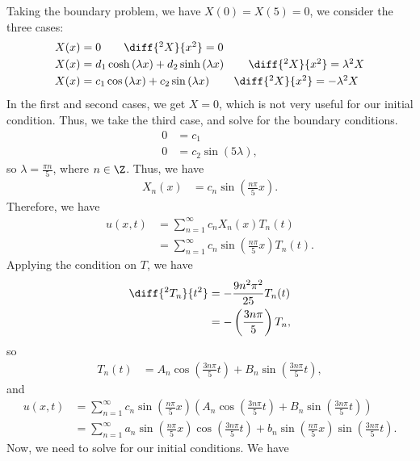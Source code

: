 \documentclass[10pt]{mypackage}
\begin{document}
\begin{example}
  Taking the boundary problem, we have $X(0) = X(5) = 0$, we consider the three cases:
  \begin{align*}
    X(x) &= 0 \tag*{$\diff{^2X}{x^2} = 0$}\\
    X(x) &= d_1\cosh\left( \lambda x \right) + d_2\sinh\left( \lambda x \right) \tag*{$\diff{^2X}{x^2} = \lambda^2 X$}\\
    X(x) &= c_1\cos\left( \lambda x \right) + c_2\sin\left( \lambda x \right) \tag*{$\diff{^2X}{x^2} = -\lambda^2 X$}
  \end{align*}
  In the first and second cases, we get $X = 0$, which is not very useful for our initial condition. Thus, we take the third case, and solve for the boundary conditions.
  \begin{align*}
    0 &= c_1\\
    0 &= c_2\sin\left( 5\lambda \right),
  \end{align*}
  so $\lambda = \frac{\pi n}{5}$, where $n\in\Z$. Thus, we have
  \begin{align*}
    X_n(x) &= c_n\sin\left( \frac{n\pi }{5}x \right).
  \end{align*}
  Therefore, we have
  \begin{align*}
    u\left( x,t \right) &= \sum_{n=1}^{\infty}c_nX_n(x)T_n(t)\\
                        &= \sum_{n=1}^{\infty}c_n\sin\left( \frac{n\pi }{5}x \right) T_n(t).
  \end{align*}
  Applying the condition on $T$, we have
  \begin{align*}
    \diff{^2T_n}{t^2} &= - \frac{9n^2\pi^2}{25}T_n(t)\\
                    &= -\left( \frac{3n\pi}{5} \right)T_n,
  \end{align*}
  so
  \begin{align*}
    T_n(t) &= A_n\cos\left( \frac{3n\pi}{5}t \right) + B_n\sin\left( \frac{3n\pi}{5}t \right),
  \end{align*}
  and
  \begin{align*}
    u\left( x,t \right) &= \sum_{n=1}^{\infty}c_n\sin\left( \frac{n\pi }{5}x \right)\left( A_n\cos\left( \frac{3n\pi}{5}t \right) + B_n\sin\left( \frac{3n\pi}{5}t \right) \right)\\
                        &= \sum_{n=1}^{\infty}a_n\sin\left( \frac{n\pi}{5}x \right)\cos\left( \frac{3n\pi}{5}t \right) + b_n\sin\left( \frac{n\pi}{5}x \right)\sin\left( \frac{3n\pi}{5}t \right).
  \end{align*}
  Now, we need to solve for our initial conditions. We have

\end{example}
\end{document}

